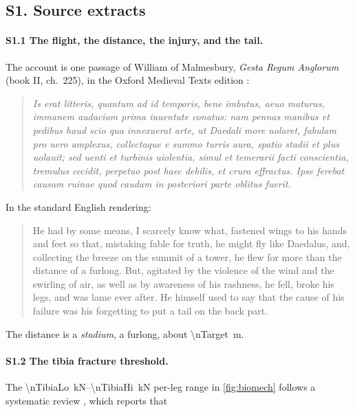 \subsection*{S1. Source extracts}

\paragraph{S1.1 The flight, the distance, the injury, and the tail.}
The account is one passage of William of Malmesbury, \textit{Gesta Regum Anglorum}
(book II, ch.~225), in the Oxford Medieval Texts edition
\autocite{williamMalmesbury_gesta}:

\begin{quote}\small\itshape
Is erat litteris, quantum ad id temporis, bene imbutus, aeuo maturus, immanem
audaciam prima iuuentute conatus: nam pennas manibus et pedibus haud scio qua
innexuerat arte, ut Daedali more uolaret, fabulam pro uero amplexus, collectaque e
summo turris aura, spatio stadii et plus uolauit; sed uenti et turbinis uiolentia,
simul et temerarii facti conscientia, tremulus cecidit, perpetuo post haec debilis,
et crura effractus. Ipse ferebat causam ruinae quod caudam in posteriori parte
oblitus fuerit.
\end{quote}

\noindent In the standard English rendering:

\begin{quote}\small
He had by some means, I scarcely know what, fastened wings to his hands and feet so
that, mistaking fable for truth, he might fly like Daedalus, and, collecting the
breeze on the summit of a tower, he flew for more than the distance of a furlong.
But, agitated by the violence of the wind and the swirling of air, as well as by
awareness of his rashness, he fell, broke his legs, and was lame ever after. He
himself used to say that the cause of his failure was his forgetting to put a tail
on the back part.
\end{quote}

\noindent The distance is a \textit{stadium}, a furlong, about \SI{\nTarget}{\meter}.

\paragraph{S1.2 The tibia fracture threshold.}
The \SIrange{\nTibiaLo}{\nTibiaHi}{\kilo\newton} per-leg range in \cref{fig:biomech}
follows a systematic review \autocite{abidin2026tibia}, which reports that

